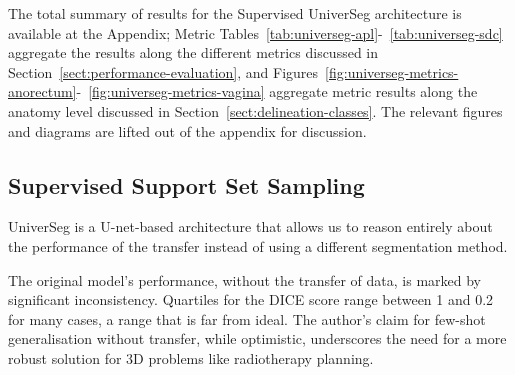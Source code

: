 \documentclass[11pt,twoside]{report}
\begin{document}



The total summary of results for the Supervised UniverSeg architecture is available at the Appendix; Metric Tables~\ref{tab:universeg-apl}-~\ref{tab:universeg-sdc} aggregate the results along the different metrics discussed in Section~\ref{sect:performance-evaluation}, and Figures~\ref{fig:universeg-metrics-anorectum}-~\ref{fig:universeg-metrics-vagina} aggregate metric results along the anatomy level discussed in Section~\ref{sect:delineation-classes}. The relevant figures and diagrams are lifted out of the appendix for discussion.

\subsection{Supervised Support Set Sampling}

UniverSeg is a U-net-based architecture that allows us to reason entirely about the performance of the transfer instead of using a different segmentation method.

The original model's performance, without the transfer of data, is marked by significant inconsistency. Quartiles for the DICE score range between 1 and 0.2 for many cases, a range that is far from ideal. The author's claim for few-shot generalisation without transfer, while optimistic, underscores the need for a more robust solution for 3D problems like radiotherapy planning. 
\end{document}
